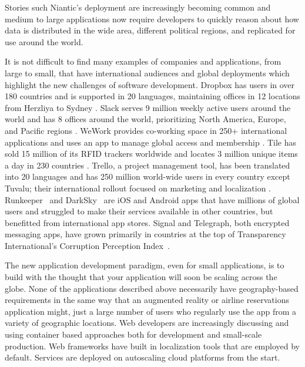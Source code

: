 Stories such Niantic's deployment are increasingly becoming common and medium to large applications now require developers to quickly reason about how data is distributed in the wide area, different political regions, and replicated for use around the world.

It is not difficult to find many examples of companies and applications, from large to small, that have international audiences and global deployments which highlight the new challenges of software development.
Dropbox has users in over 180 countries and is supported in 20 languages, maintaining offices in 12 locations from Herzliya to Sydney \cite{dropbox}.
Slack serves 9 million weekly active users around the world and has 8 offices around the world, prioritizing North America, Europe, and Pacific regions \cite{slack}.
WeWork provides co-working space in 250+ international applications and uses an app to manage global access and membership \cite{wework_global_access}.
Tile has sold 15 million of its RFID trackers worldwide and locates 3 million unique items a day in 230 countries \cite{tile}.
Trello, a project management tool, has been translated into 20 languages and has 250 million world-wide users in every country except Tuvalu; their international rollout focused on marketing and localization \cite{trello}.
Runkeeper~\cite{runkeeper} and DarkSky~\cite{darksky} are iOS and Android apps that have millions of global users and struggled to make their services available in other countries, but benefitted from international app stores.
Signal and Telegraph, both encrypted messaging apps, have grown primarily in countries at the top of Transparency International's Corruption Perception Index~\cite{signal}.

The new application development paradigm, even for small applications, is to build with the thought that your application will soon be scaling across the globe.
None of the applications described above necessarily have geography-based requirements in the same way that an augmented reality or airline reservations application might, just a large number of users who regularly use the app from a variety of geographic locations.
Web developers are increasingly discussing and using container based approaches both for development and small-scale production.
Web frameworks have built in localization tools that are employed by default.
Services are deployed on autoscaling cloud platforms from the start.

